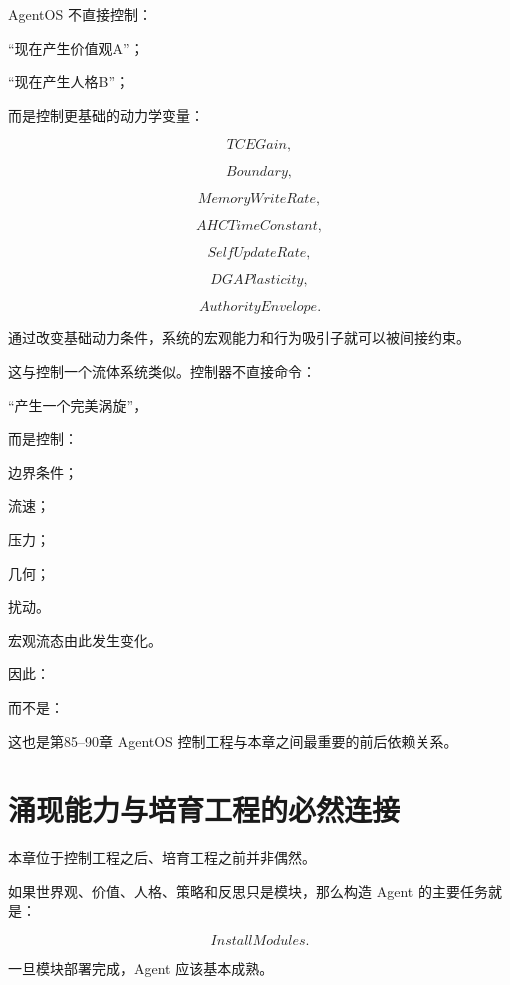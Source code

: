 AgentOS 不直接控制：

``现在产生价值观A''；

``现在产生人格B''；

而是控制更基础的动力学变量：

\[
TCEGain,
\]

\[
Boundary,
\]

\[
MemoryWriteRate,
\]

\[
AHCTimeConstant,
\]

\[
SelfUpdateRate,
\]

\[
DGAPlasticity,
\]

\[
AuthorityEnvelope.
\]

通过改变基础动力条件，系统的宏观能力和行为吸引子就可以被间接约束。

这与控制一个流体系统类似。控制器不直接命令：

``产生一个完美涡旋''，

而是控制：

边界条件；

流速；

压力；

几何；

扰动。

宏观流态由此发生变化。

因此：

\begin{statementbox}
\centering
{}
\end{statementbox}

而不是：

\begin{statementbox}
\centering
{}
\end{statementbox}

这也是第85--90章 AgentOS 控制工程与本章之间最重要的前后依赖关系。

\section{涌现能力与培育工程的必然连接}

本章位于控制工程之后、培育工程之前并非偶然。

如果世界观、价值、人格、策略和反思只是模块，那么构造 Agent 的主要任务就是：

\[
InstallModules.
\]

一旦模块部署完成，Agent 应该基本成熟。

